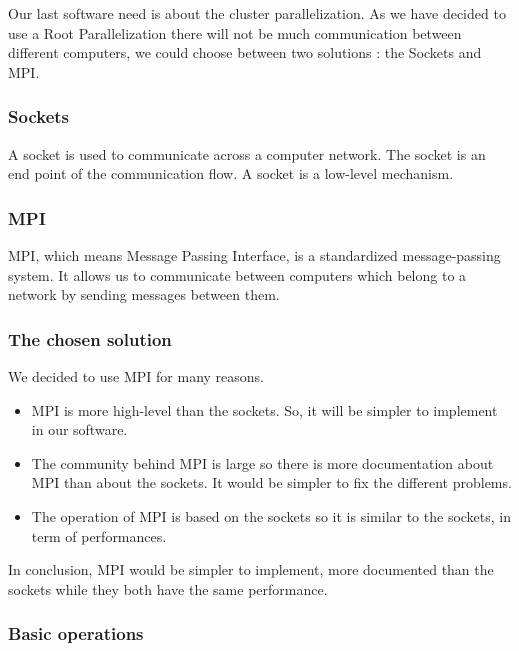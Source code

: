 Our last software need is about the cluster parallelization. As we have decided to use a Root Parallelization there will not be much communication between different computers, we could choose between two solutions : the Sockets and MPI.

\subsubsection{Sockets}

A socket is used to communicate across a computer network. The socket is an end point of the communication flow. A socket is a low-level mechanism.

\subsubsection{MPI}

MPI, which means Message Passing Interface, is a standardized message-passing system. It allows us to communicate between computers which belong to a network by sending messages between them. 

\subsubsection{The chosen solution}

We decided to use MPI for many reasons.
\begin{itemize}
\item MPI is more high-level than the sockets. So, it will be simpler to implement in our software.
\item The community behind MPI is large so there is more documentation about MPI than about the sockets. It would be simpler to fix the different problems.
\item The operation of MPI is based on the sockets so it is similar to the sockets, in term of performances.
\end{itemize}
In conclusion, MPI would be simpler to implement, more documented than the sockets while they both have the same performance.

\subsubsection{Basic operations}


